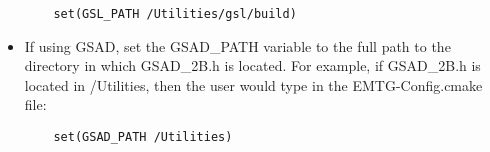\begin{itemize}
	\begin{verbatim}
	set(GSL_PATH /Utilities/gsl/build)
	\end{verbatim}
	
	\item If using \ac{GSAD}, set the GSAD\_PATH variable to the full path to the directory in which GSAD\_2B.h is located. For example, if GSAD\_2B.h is located in /Utilities, then the user would type in the EMTG-Config.cmake file:
	
	\begin{verbatim}
	set(GSAD_PATH /Utilities)
	\end{verbatim}
\end{itemize}